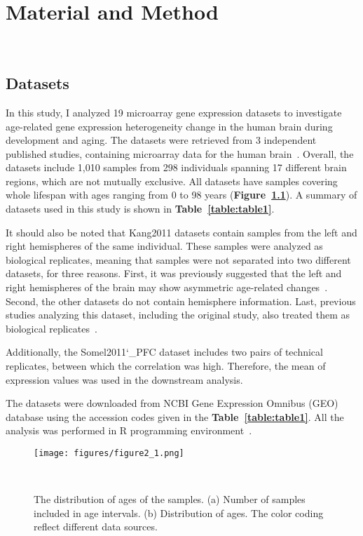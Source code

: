 \chapter{Material and Method}~\label{chp:b2}
\section{Datasets}
In this study, I analyzed 19 microarray gene expression datasets to investigate age-related gene expression heterogeneity change in the human brain during development and aging.
The datasets were retrieved from 3 independent published studies, containing microarray data for the human brain~\cite{Colantuoni2011, Kang2011, Somel2011, Somel2010}.
Overall, the datasets include 1,010 samples from 298 individuals spanning 17 different brain regions, which are not mutually exclusive.
All datasets have samples covering whole lifespan with ages ranging from 0 to 98 years (\textbf{Figure~\ref{fig:fig2.1}}).
A summary of datasets used in this study is shown in \textbf{Table~\ref{table:table1}}.

It should also be noted that Kang2011 datasets contain samples from the left and right hemispheres of the same individual.
These samples were analyzed as biological replicates, meaning that samples were not separated into two different datasets, for three reasons.
First, it was previously suggested that the left and right hemispheres of the brain may show asymmetric age-related changes~\cite{Sun2005, Dolcos2002}.
Second, the other datasets do not contain hemisphere information.
Last, previous studies analyzing this dataset, including the original study, also treated them as biological replicates~\cite{Kang2011, Donertas2017}.

Additionally, the Somel2011\char`_PFC dataset includes two pairs of technical replicates, between which the correlation was high. 
Therefore, the mean of expression values was used in the downstream analysis.

The datasets were downloaded from NCBI Gene Expression Omnibus (GEO) database using the accession codes given in the \textbf{Table~\ref{table:table1}}. 
All the analysis was performed in R programming environment~\cite{R2020}.

\begin{figure}[h]
\centering
\texttt{[image: figures/figure2\_1.png]}
\caption{The distribution of ages of the samples. 
(a) Number of samples included in age intervals. 
(b) Distribution of ages. The color coding reflect different data sources.}~\label{fig:fig2.1}
\end{figure}

